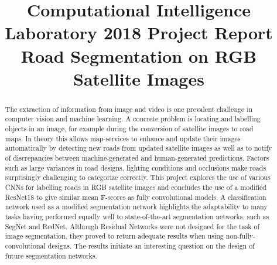 \documentclass[10pt,conference,compsocconf]{IEEEtran}
\begin{document}
\title{Computational Intelligence Laboratory 2018 \textendash{} Project Report\\{\large Road Segmentation on RGB Satellite Images}}

\author{
}

\maketitle

\begin{abstract}
    The extraction of information from image and video is one prevalent challenge in computer vision and machine learning.
    A concrete problem is locating and labelling objects in an image, for example during the conversion of satellite images to road maps. In theory this allows map-services to enhance and update their images automatically by detecting new roads from updated satellite images as well as to notify of discrepancies between machine-generated and human-generated predictions.
    Factors such as large variances in road designs, lighting conditions and occlusions make roads surprisingly challenging to categorize correctly.
    This project explores the use of various CNNs for labelling roads in RGB satellite images and concludes the use of a modified ResNet18 to give similar mean F-scores as fully convolutional models.
    A classification network used as a modified segmentation network highlights the adaptability to many tasks having performed equally well to state-of-the-art segmentation networks, such as SegNet and RedNet.
    Although Residual Networks were not designed for the task of image segmentation, they proved to return adequate results when using non-fully-convolutional designs. The results initiate an interesting question on the design of future segmentation networks.
\end{abstract}
\end{document}
